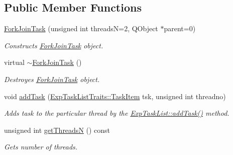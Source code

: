 \subsection*{Public Member Functions}
\begin{DoxyCompactItemize}
\item 
\hyperlink{class_fork_join_task_a2be71d32906e00a7776655768419a3a3}{Fork\+Join\+Task} (unsigned int threads\+N=2, Q\+Object $\ast$parent=0)
\begin{DoxyCompactList}\small\item\em Constructs \hyperlink{class_fork_join_task}{Fork\+Join\+Task} object. \end{DoxyCompactList}\item 
\hypertarget{class_fork_join_task_ac6ff10aa0b6d5cead09b630adabe8cef}{}virtual \hyperlink{class_fork_join_task_ac6ff10aa0b6d5cead09b630adabe8cef}{$\sim$\+Fork\+Join\+Task} ()\label{class_fork_join_task_ac6ff10aa0b6d5cead09b630adabe8cef}

\begin{DoxyCompactList}\small\item\em Destroyes \hyperlink{class_fork_join_task}{Fork\+Join\+Task} object. \end{DoxyCompactList}\item 
void \hyperlink{class_fork_join_task_aff58c038df10cd36fa8842486fa46d09}{add\+Task} (\hyperlink{struct_exp_task_list_traits_1_1_task_item}{Exp\+Task\+List\+Traits\+::\+Task\+Item} tsk, unsigned int threadno)
\begin{DoxyCompactList}\small\item\em Adds task to the particular thread by the \hyperlink{class_exp_task_list_a3e582c5e9ce6f23f86de96d885277fd2}{Exp\+Task\+List\+::add\+Task()} method. \end{DoxyCompactList}\item 
\hypertarget{class_fork_join_task_aaad36fef1a41e7ec3056e2d70d79c628}{}unsigned int \hyperlink{class_fork_join_task_aaad36fef1a41e7ec3056e2d70d79c628}{get\+Threads\+N} () const \label{class_fork_join_task_aaad36fef1a41e7ec3056e2d70d79c628}

\begin{DoxyCompactList}\small\item\em Gets number of threads. \end{DoxyCompactList}\end{DoxyCompactItemize}

